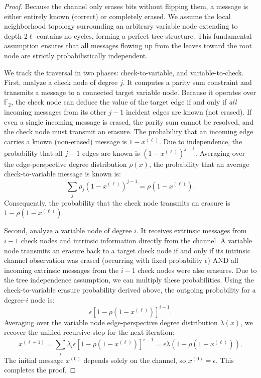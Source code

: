 \begin{proof}
Because the channel only erases bits without flipping them, a message is either entirely known (correct) or completely erased. We assume the local neighborhood topology surrounding an arbitrary variable node extending to depth $2\ell$ contains no cycles, forming a perfect tree structure. This fundamental assumption ensures that all messages flowing up from the leaves toward the root node are strictly probabilistically independent.

We track the traversal in two phases: check-to-variable, and variable-to-check.
First, analyze a check node of degree $j$. It computes a parity sum constraint and transmits a message to a connected target variable node. Because it operates over $\mathbb{F}_2$, the check node can deduce the value of the target edge if and only if \textit{all} incoming messages from its other $j - 1$ incident edges are known (not erased). If even a single incoming message is erased, the parity sum cannot be resolved, and the check node must transmit an erasure.
The probability that an incoming edge carries a known (non-erased) message is $1 - x^{(\ell)}$. Due to independence, the probability that all $j-1$ edges are known is $(1 - x^{(\ell)})^{j-1}$. Averaging over the edge-perspective degree distribution $\rho(x)$, the probability that an average check-to-variable message is known is:
\[
\sum_j \rho_j (1 - x^{(\ell)})^{j-1} = \rho(1 - x^{(\ell)}).
\]
Consequently, the probability that the check node transmits an erasure is $1 - \rho(1 - x^{(\ell)})$.

Second, analyze a variable node of degree $i$. It receives extrinsic messages from $i-1$ check nodes and intrinsic information directly from the channel. A variable node transmits an erasure back to a target check node if and only if its intrinsic channel observation was erased (occurring with fixed probability $\epsilon$) AND all incoming extrinsic messages from the $i-1$ check nodes were also erasures. Due to the tree independence assumption, we can multiply these probabilities. Using the check-to-variable erasure probability derived above, the outgoing probability for a degree-$i$ node is:
\[
\epsilon \left[ 1 - \rho(1 - x^{(\ell)}) \right]^{i-1}.
\]
Averaging over the variable node edge-perspective degree distribution $\lambda(x)$, we recover the unified recursive step for the next iteration:
\[
x^{(\ell+1)} = \sum_i \lambda_i \epsilon \left[ 1 - \rho(1 - x^{(\ell)}) \right]^{i-1} = \epsilon \lambda\left( 1 - \rho(1 - x^{(\ell)}) \right).
\]
The initial message $x^{(0)}$ depends solely on the channel, so $x^{(0)} = \epsilon$. This completes the proof.
\end{proof}

